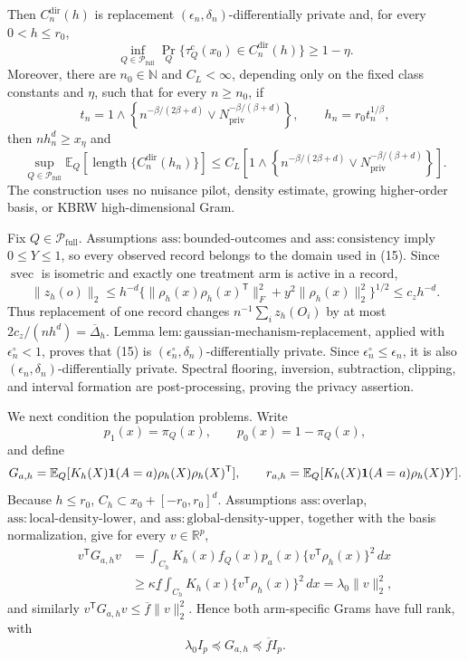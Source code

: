 Then \(C_n^{\mathrm{dir}}(h)\) is replacement \((\epsilon_n,\delta_n)\)-differentially private and, for every \(0<h\le r_0\),
\[
 \inf_{Q\in\mathcal P_{\mathrm{full}}}
 \Pr_Q\{\tau_Q^{\mathrm c}(x_0)\in C_n^{\mathrm{dir}}(h)\}\ge1-\eta.
\tag{18}
\]
Moreover, there are \(n_0\in\mathbb N\) and \(C_L<\infty\), depending only on the fixed class constants and \(\eta\), such that for every \(n\ge n_0\), if
\[
 t_n=1\wedge\left\{n^{-\beta/(2\beta+d)}
 \vee N_{\mathrm{priv}}^{-\beta/(\beta+d)}\right\},
 \qquad h_n=r_0t_n^{1/\beta},
\]
then \(nh_n^d\ge x_\eta\) and
\[
 \sup_{Q\in\mathcal P_{\mathrm{full}}}
 \mathbb E_Q[\operatorname{length}\{C_n^{\mathrm{dir}}(h_n)\}]
 \le C_L\left[1\wedge\left\{n^{-\beta/(2\beta+d)}
 \vee N_{\mathrm{priv}}^{-\beta/(\beta+d)}\right\}\right].
\tag{19}
\]
The construction uses no nuisance pilot, density estimate, growing higher-order basis, or KBRW high-dimensional Gram.

Fix \(Q\in\mathcal P_{\mathrm{full}}\).  Assumptions \(\mathrm{ass{:}bounded\text{-}outcomes}\) and \(\mathrm{ass{:}consistency}\) imply \(0\le Y\le1\), so every observed record belongs to the domain used in (15).  Since \(\operatorname{svec}\) is isometric and exactly one treatment arm is active in a record,
\[
 \|z_h(o)\|_2
 \le h^{-d}\{\|\rho_h(x)\rho_h(x)^{\mathsf T}\|_F^2
                  +y^2\|\rho_h(x)\|_2^2\}^{1/2}
 \le c_zh^{-d}.
\tag{20}
\]
Thus replacement of one record changes \(n^{-1}\sum_i z_h(O_i)\) by at most \(2c_z/(nh^d)=\overline\Delta_h\).  Lemma \(\mathrm{lem{:}gaussian\text{-}mechanism\text{-}replacement}\), applied with \(\epsilon_n^\circ<1\), proves that (15) is \((\epsilon_n^\circ,\delta_n)\)-differentially private.  Since \(\epsilon_n^\circ\le\epsilon_n\), it is also \((\epsilon_n,\delta_n)\)-differentially private.  Spectral flooring, inversion, subtraction, clipping, and interval formation are post-processing, proving the privacy assertion.

We next condition the population problems.  Write
\[
 p_1(x)=\pi_Q(x),\qquad p_0(x)=1-\pi_Q(x),
\]
and define
\[
 G_{a,h}=\mathbb E_Q[K_h(X){\bf1}(A=a)\rho_h(X)\rho_h(X)^{\mathsf T}],
 \qquad
 r_{a,h}=\mathbb E_Q[K_h(X){\bf1}(A=a)\rho_h(X)Y].
\]
Because \(h\le r_0\), \(C_h\subset x_0+[-r_0,r_0]^d\).  Assumptions \(\mathrm{ass{:}overlap}\), \(\mathrm{ass{:}local\text{-}density\text{-}lower}\), and \(\mathrm{ass{:}global\text{-}density\text{-}upper}\), together with the basis normalization, give for every \(v\in\mathbb R^p\),
\[
 \begin{aligned}
 v^{\mathsf T}G_{a,h}v
 &=\int_{C_h}K_h(x)f_Q(x)p_a(x)
       \{v^{\mathsf T}\rho_h(x)\}^2\,dx\\
 &\ge\kappa\underline f\int_{C_h}K_h(x)
       \{v^{\mathsf T}\rho_h(x)\}^2\,dx
 =\lambda_0\|v\|_2^2,
 \end{aligned}
\tag{21}
\]
and similarly \(v^{\mathsf T}G_{a,h}v\le\overline f\|v\|_2^2\).  Hence both arm-specific Grams have full rank, with
\[
 \lambda_0I_p\preceq G_{a,h}\preceq\overline f I_p.
\tag{22}
\]

